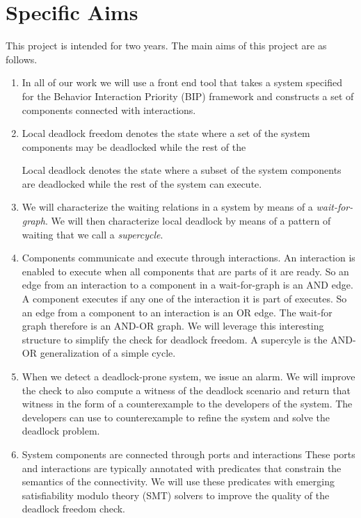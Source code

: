 \section{Specific Aims}

This project is intended for two years.
The main aims of this project are as follows.

\begin{enumerate}

\item 
In all of our work we will use a front end tool that
takes a system specified for the Behavior Interaction Priority (BIP)
framework and constructs a set of components connected 
with interactions. 

\item 
Local deadlock freedom denotes the state where a set of the 
system components may be deadlocked while the rest of the 

Local deadlock denotes the state where a subset of the 
system components are deadlocked while the rest of the 
system can execute. 

\item
We will characterize the waiting relations in a system by means of a
{\em wait-for-graph}. We will then characterize local deadlock by
means of a pattern of waiting that we call a \emph{supercycle}.

\item 
Components communicate and execute through interactions. 
An interaction is enabled to execute when all components that 
are parts of it are ready. 
So an edge from an interaction to a component in a wait-for-graph
is an AND edge. 
A component executes if any one of the interaction it is part of
executes. So an edge from a component to an interaction is an OR
edge. 
The wait-for graph therefore is an AND-OR graph. 
We will leverage this interesting structure to simplify the
check for deadlock freedom. 
A supercyle is the AND-OR generalization of a simple cycle.


\item 
When we detect a deadlock-prone system, we issue an alarm. 
We will improve the check to also compute a witness of the deadlock scenario 
and return that witness in the form of a counterexample 
to the developers of the system. 
The developers can use to counterexample to refine the system and solve
the deadlock problem. 

\item 
System components are connected through ports and interactions
These ports and interactions are typically annotated with predicates
that constrain the semantics of the connectivity. 
We will use these predicates with emerging satisfiability modulo theory (SMT) 
solvers to improve the quality of the deadlock freedom check.


\end{enumerate}
